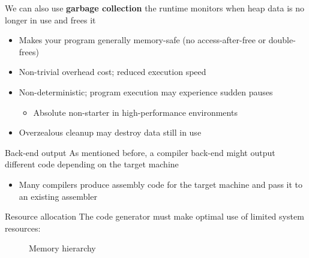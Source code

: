 \documentclass[../index.tex]{subfiles}
\begin{document}
\begin{frame}[fragile]{\currenttitle}
  We can also use \textbf{garbage collection} \textendash{} the runtime
  monitors when heap data is no longer in use and frees it

  \only<+->
  \begin{itemize}
    \item<+-> Makes your program generally memory-safe (no access-after-free or
      double-frees)
    \item<+-> Non-trivial overhead cost; reduced execution speed
    \item<+-> Non-deterministic; program execution may experience sudden pauses
      \begin{itemize}
        \item Absolute non-starter in high-performance environments
      \end{itemize}
    \item<+-> Overzealous cleanup may destroy data still in use
  \end{itemize}
\end{frame}

\renewcommand{\currenttitle}{Back-end output}
\begin{frame}[fragile]{\currenttitle}
  As mentioned before, a compiler back-end might output different code
  depending on the target machine

  \begin{itemize}
    \item Many compilers produce assembly code for the target machine and pass
      it to an existing assembler
  \end{itemize}
\end{frame}


\renewcommand{\currenttitle}{Resource allocation}
\begin{frame}[fragile]{\currenttitle}
  The code generator must make optimal use of limited system resources: \\[2em]

  \begin{figure}
    \centering
    \caption{Memory hierarchy}
  \end{figure}
\end{frame}
\end{document}
